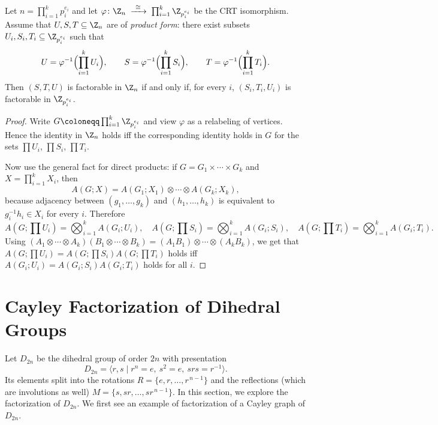 \documentclass{file}
\begin{document}
\begin{thm}\label{thm:CRT}
Let $n=\prod_{i=1}^k p_i^{e_i}$ and let
$\varphi\colon \Z_n \;\xrightarrow{\ \cong\ }\; \prod_{i=1}^k \Z_{p_i^{e_i}}$
be the CRT isomorphism.
Assume that $U,S,T\subseteq \Z_n$ are of \emph{product form}:
there exist subsets $U_i,S_i,T_i\subseteq \Z_{p_i^{e_i}}$ such that
\[
U=\varphi^{-1}\Bigl(\prod_{i=1}^k U_i\Bigr),\qquad
S=\varphi^{-1}\Bigl(\prod_{i=1}^k S_i\Bigr),\qquad
T=\varphi^{-1}\Bigl(\prod_{i=1}^k T_i\Bigr).
\]
Then $(S,T,U)$ is factorable in $\Z_n$ if and only if, for every $i$,
$(S_i,T_i,U_i)$ is factorable in $\Z_{p_i^{e_i}}$.
\end{thm}
\begin{proof}
Write $G\coloneqq \prod_{i=1}^k \Z_{p_i^{e_i}}$ and view $\varphi$ as a relabeling
of vertices. Hence the identity in $\Z_n$ holds iff the corresponding
identity holds in $G$ for the sets $\prod U_i$, $\prod S_i$, $\prod T_i$.

Now use the general fact for direct products: if $G=G_1\times\cdots\times G_k$
and $X=\prod_{i=1}^k X_i$, then
\[
A(G;X)=A(G_1;X_1)\otimes \cdots \otimes A(G_k;X_k),
\]
because adjacency between $(g_1,\dots,g_k)$ and $(h_1,\dots,h_k)$ is equivalent to
$g_i^{-1}h_i\in X_i$ for every $i$.
Therefore
\[
A(G;\textstyle\prod U_i)
=
\bigotimes_{i=1}^k A(G_i;U_i),\quad
A(G;\textstyle\prod S_i)
=
\bigotimes_{i=1}^k A(G_i;S_i),\quad
A(G;\textstyle\prod T_i)
=
\bigotimes_{i=1}^k A(G_i;T_i).
\]
Using $(A_1\otimes\cdots\otimes A_k)(B_1\otimes\cdots\otimes B_k)
=(A_1B_1)\otimes\cdots\otimes(A_kB_k)$, we get that
$A(G;\prod U_i)=A(G;\prod S_i)A(G;\prod T_i)$ holds iff
$A(G_i;U_i)=A(G_i;S_i)A(G_i;T_i)$ holds for all $i$.
\end{proof}


\section{Cayley Factorization of Dihedral Groups}


Let $D_{2n}$ be the dihedral group of order $2n$ with presentation
\[
D_{2n}=\langle r,s \mid r^n=e,\ s^2=e,\ srs=r^{-1}\rangle.
\]
Its elements split into the rotations 
$R=\{e,r,\dots,r^{\,n-1}\}$
and the reflections (which are involutions as well)
$M=\{s,sr,\dots,sr^{\,n-1}\}$.
In this section, we explore the factorization of $D_{2n}$.
We first see an example of factorization of a Cayley graph of $D_{2n}$.
\end{document}
